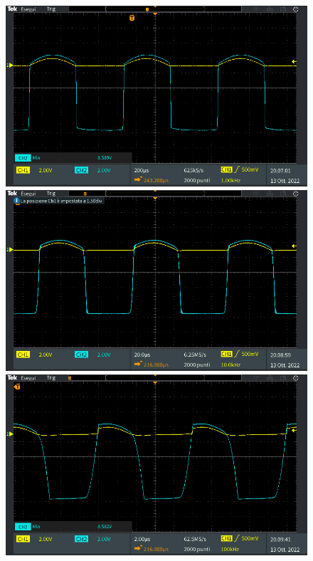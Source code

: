 \begin{figure}[h]
	\centering
	\begin{minipage}{.496\textwidth}
		\includegraphics[width=\linewidth]{./ImageFiles/Laboratorio 2/TEK00030.PNG}
	\end{minipage}
	\begin{minipage}{.496\textwidth}
		\includegraphics[width=\linewidth]{./ImageFiles/Laboratorio 2/TEK00032.PNG}
	\end{minipage}
	\begin{minipage}{.496\textwidth}
		\includegraphics[width=\linewidth]{./ImageFiles/Laboratorio 2/TEK00034.PNG}

\end{minipage}
\end{figure}
